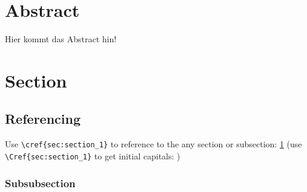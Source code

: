 \newpage

\section*{Abstract}
Hier kommt das Abstract hin!


\newpage
{}

\section{Section} \label{sec:section_1}
	\blindtext
	\subsection{Referencing} \label{sec:subsection}
		Use \verb*|\cref{sec:section_1}| to reference to the any section or subsection: \cref{sec:section_1} (use \verb*|| to get initial capitals: \Cref{sec:section_1})
		\subsubsection{Subsubsection} \label{sec:subsubsection}
			\blindtext
			

\onecolumn

\printbibliography

	


